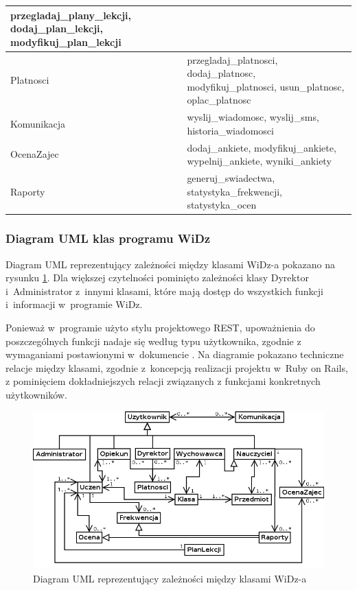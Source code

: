 \documentclass[12pt,leqno,twoside]{mwart}
\begin{document}
\begin{table}[h]
\begin{tabular}{|l|p{12cm}|}
{				przegladaj\_plany\_lekcji, dodaj\_plan\_lekcji, modyfikuj\_plan\_lekcji 
			}\\ \hline
		Platnosci &
			\parbox[t]{12cm}{
			\raggedright			
				przegladaj\_platnosci, dodaj\_platnosc, modyfikuj\_platnosci, usun\_platnosc, oplac\_platnosc 
			}\\ \hline
		Komunikacja & wyslij\_wiadomosc, wyslij\_sms, historia\_wiadomosci \\ \hline
		OcenaZajec &
			\parbox[t]{12cm}{
			\raggedright			
				dodaj\_ankiete, modyfikuj\_ankiete, wypelnij\_ankiete, wyniki\_ankiety 
			}\\ \hline
		Raporty & generuj\_swiadectwa, statystyka\_frekwencji, statystyka\_ocen \\ \hline
		\end{tabular}
	\label{kluczowe_klasy}
\end{table}

\subsubsection{Diagram UML klas programu WiDz}\label{UML}
\noindent Diagram UML reprezentujący zależności między klasami WiDz-a pokazano na rysunku \ref{fig:uml}. Dla większej czytelności pominięto zależności klasy Dyrektor i~Administrator z~innymi klasami, które mają dostęp do wszystkich funkcji i~informacji w~programie WiDz.

\indent Ponieważ w~programie użyto stylu projektowego REST, upoważnienia do poszczególnych funkcji nadaje się według typu użytkownika, zgodnie z wymaganiami postawionymi w~dokumencie \cite{WYM}. Na diagramie pokazano techniczne relacje między klasami, zgodnie z~koncepcją realizacji projektu w~Ruby on Rails, z pominięciem dokładniejszych relacji związanych z funkcjami konkretnych użytkowników.
\begin{figure}[ht]
\center
\includegraphics[width=16cm]{uml_klas.png}
\caption{Diagram UML reprezentujący zależności między klasami WiDz-a}
\label{fig:uml}
\end{figure}
\end{document}
